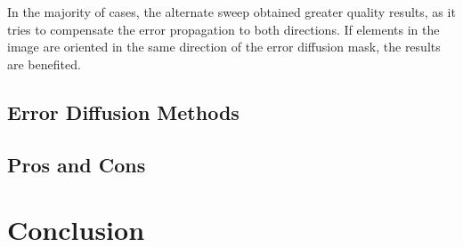 \documentclass[]{IEEEtran}
\begin{document}
In the majority of cases, the alternate sweep obtained greater quality results, as it tries to compensate the error propagation to both directions. If elements in the image are oriented in the same direction of the error diffusion mask, the results are benefited. 

\subsection{Error Diffusion Methods}

\subsection{Pros and Cons}

\section{Conclusion}
\end{document}
